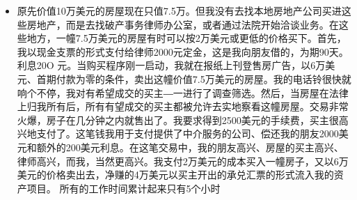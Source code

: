 \documentclass[UTF8,a4paper,8pt]{ctexbook}
\begin{document}
\begin{itemize}
			\item 原先价值10万美元的房屋现在只值7.5万。但我没有去找本地房地产公司买进这些房地产，而是去找破产事务律师办公室，或者通过法院开始洽谈业务。在这些地方，一幢7.5万美元的房屋有时可以按2万美元或更低的价格买下。首先，我以现金支票的形式支付给律师2000元定金，这是我向朋友借的，为期90天。 利息20O 元。当购买程序刚一启动，我就在报纸上刊登售房广告，以6万美元、首期付款为零的条件，卖出这幢价值7.5万美元的房屋。我的电话铃很快就响个不停，我对有希望成交的买主―一进行了调查筛选。然后，当房屋在法律上归我所有后，所有有望成交的买主都被允许去实地察看这幢房屋。交易非常火爆，房子在几分钟之内就售出了。我要求得到2500美元的手续费，买主很高兴地支付了。这笔钱我用于支付提供了中介服务的公司、偿还我的朋友2000美元和额外的200美元利息。在这笔交易中，我的朋友高兴、房屋的买主高兴、律师高兴，而我，当然更高兴。我支付2万美元的成本买入一幢房子，又以6万美元的价格卖出去，净赚的4万美元以买主开出的承兑汇票的形式流入我的资产项目。 所有的工作时间累计起来只有5个小时
			

\end{itemize}
\end{document}
